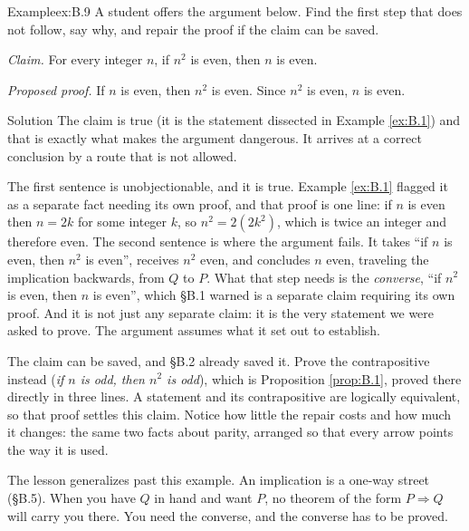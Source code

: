 \documentclass[a4paper,12pt,oneside]{memoir}
\begin{document}
\begin{workedexample}
\begin{envexample}{Example}{ex:B.9}{}
A student offers the argument below. Find the first step that does not follow, say why, and repair the proof if the claim can be saved.

\emph{Claim.} For every integer \(n\), if \(n^{2}\) is even, then \(n\) is even.

\emph{Proposed proof.} If \(n\) is even, then \(n^{2}\) is even. Since \(n^{2}\) is even, \(n\) is even.
\end{envexample}
\begin{envsolution}{Solution}{}{}
The claim is true (it is the statement dissected in Example \ref{ex:B.1}) and that is exactly what makes the argument dangerous. It arrives at a correct conclusion by a route that is not allowed.

The first sentence is unobjectionable, and it is true. Example \ref{ex:B.1} flagged it as a separate fact needing its own proof, and that proof is one line: if \(n\) is even then \(n = 2k\) for some integer \(k\), so \(n^{2} = 2(2k^{2})\), which is twice an integer and therefore even. The second sentence is where the argument fails. It takes “if \(n\) is even, then \(n^{2}\) is even”, receives \(n^{2}\) even, and concludes \(n\) even, traveling the implication backwards, from \(Q\) to \(P\). What that step needs is the \emph{converse}, “if \(n^{2}\) is even, then \(n\) is even”, which §B.1 warned is a separate claim requiring its own proof. And it is not just any separate claim: it is the very statement we were asked to prove. The argument assumes what it set out to establish.

The claim can be saved, and §B.2 already saved it. Prove the contrapositive instead (\emph{if \(n\) is odd, then \(n^{2}\) is odd}), which is Proposition \ref{prop:B.1}, proved there directly in three lines. A statement and its contrapositive are logically equivalent, so that proof settles this claim. Notice how little the repair costs and how much it changes: the same two facts about parity, arranged so that every arrow points the way it is used.

The lesson generalizes past this example. An implication is a one-way street (§B.5). When you have \(Q\) in hand and want \(P\), no theorem of the form \(P \Rightarrow Q\) will carry you there. You need the converse, and the converse has to be proved.
\end{envsolution}
\end{workedexample}
\end{document}
